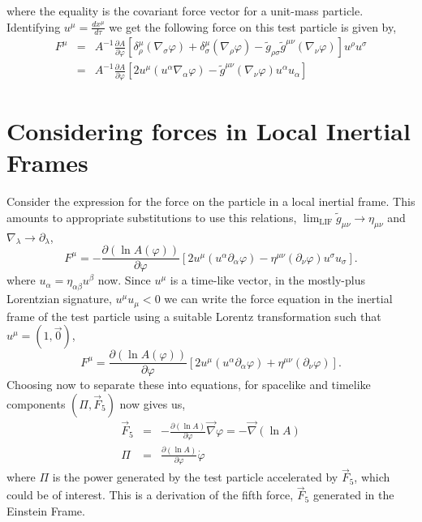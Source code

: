 where the equality is the covariant force vector for a unit-mass particle. Identifying $u^{\mu} = \frac{dx^{\mu}}{d\tau}$ we get the following force on this test particle is given by,
\begin{eqnarray}
    F^{\mu} &=& A^{-1}\frac{\partial A}{\partial\varphi}\left[\delta^{\mu}_{\rho}(\nabla_{\sigma}\varphi) + \delta^{\mu}_{\sigma}(\nabla_{\rho}\varphi) - \tilde{g}_{\rho\sigma}\tilde{g}^{\mu\nu}(\nabla_{\nu}\varphi)\right]u^{\rho}u^{\sigma} \\
    &=& A^{-1}\frac{\partial A}{\partial\varphi}\left[2u^{\mu}(u^{\alpha}\nabla_{\alpha}\varphi) - \tilde{g}^{\mu\nu}(\nabla_{\nu}\varphi)u^{\alpha}u_{\alpha}\right]
\end{eqnarray}
\section{Considering forces in Local Inertial Frames}
Consider the expression for the force on the particle in a local inertial frame. This amounts to appropriate substitutions to use this relations, $\lim_{\text{LIF}}\tilde{g}_{\mu\nu} \rightarrow \eta_{\mu\nu}$ and $\nabla_{\lambda}\rightarrow\partial_{\lambda}$,
\begin{equation}
    F^{\mu} =  -\frac{\partial (\ln A(\varphi))}{\partial\varphi}\left[2u^{\mu}(u^{\alpha}\partial_{\alpha}\varphi) - \eta^{\mu\nu}(\partial_{\nu}\varphi)u^{\sigma}u_{\sigma}\right].
\end{equation}
where $u_{\alpha}= \eta_{\alpha\beta}u^{\beta}$ now. Since $u^{\mu}$ is a time-like vector, in the mostly-plus Lorentzian signature, $u^{\mu}u_{\mu} < 0$ we can write the force equation in the inertial frame of the test particle using a suitable Lorentz transformation such that $u^{\mu} = (1, \vec{0})$, 
\begin{equation}
    F^{\mu} = \frac{\partial (\ln A(\varphi))}{\partial\varphi}\left[2u^{\mu}(u^{\alpha}\partial_{\alpha}\varphi) + \eta^{\mu\nu}(\partial_{\nu}\varphi)\right].
\end{equation}
Choosing now to separate these into equations, for spacelike and timelike components $(\Pi, \vec{F}_5)$ now gives us,
\begin{eqnarray}
    \vec{F}_5 &=& -\frac{\partial (\ln A)}{\partial \varphi}\vec{\nabla}\varphi =-\vec{\nabla}\left(\ln A\right)\\
    \Pi &=& \frac{\partial (\ln A)}{\partial \varphi}\dot{\varphi}
\end{eqnarray}
where $\Pi$ is the power generated by the test particle accelerated by $\vec{F}_5$, which could be of interest. This is a derivation of the fifth force, $\vec{F}_5$ generated in the Einstein Frame.   

